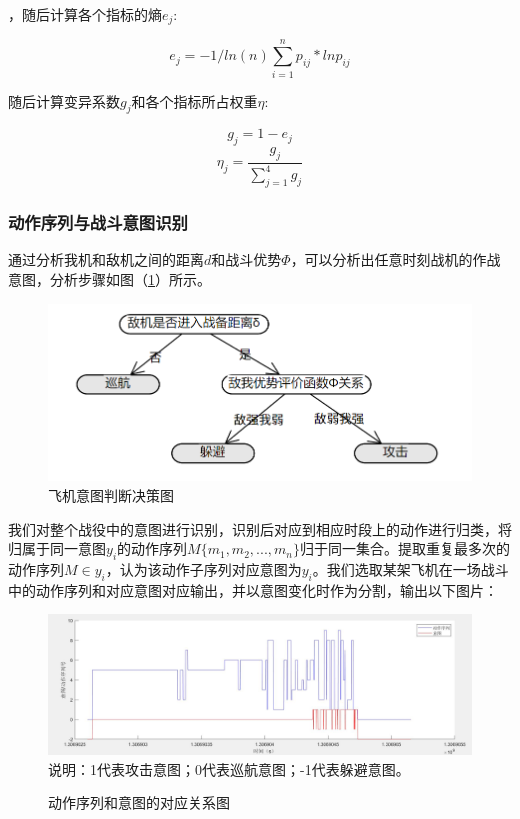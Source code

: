 \documentclass{my_paper}
\begin{document}
，随后计算各个指标的熵$e_j$:

\begin{equation}
    e_j = -1/ln(n) \sum_{i=1}^{n} p_{ij}*ln p_{ij}
\end{equation}

随后计算变异系数$g_j$和各个指标所占权重$ \eta $:

\begin{equation}
    g_j = 1-e_j
\end{equation}
\begin{equation}
    \eta_j = \frac{g_j}{\sum_{j=1}^{4}g_j}
\end{equation}

\subsubsection{动作序列与战斗意图识别}

通过分析我机和敌机之间的距离$d$和战斗优势$\Phi$，可以分析出任意时刻战机的作战意图，分析步骤如图（\ref{pdjc}）所示。

\begin {figure}[h]
\centering %
\includegraphics[width=\textwidth]{yitu.png}
\caption{飞机意图判断决策图} %
\label{pdjc}
\end {figure}

我们对整个战役中的意图进行识别，识别后对应到相应时段上的动作进行归类，将归属于同一意图$y_i$的动作序列$M\{m_1,m_2,...,m_n\}$归于同一集合。提取重复最多次的动作序列$M\in y_i$，认为该动作子序列对应意图为$y_i$。我们选取某架飞机在一场战斗中的动作序列和对应意图对应输出，并以意图变化时作为分割，输出以下图片：

\begin {figure}[h]
\centering %
\includegraphics[width=\textwidth]{9.jpg}
说明：1代表攻击意图；0代表巡航意图；-1代表躲避意图。
\caption{动作序列和意图的对应关系图} %
\label{five}
\end {figure}
\end{document}
